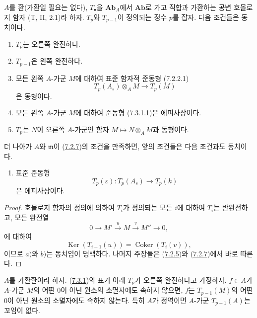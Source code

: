 \begin{proposition}[7.3.1]
\label{III.7.3.1-fr}
$A$를 환(가환일 필요는 없다), $T_\bullet$을 $\mathbf{Ab}_A$에서
$\mathbf{Ab}$로 가고 직합과 가환하는 공변 호몰로지 함자 (T, II,
2.1)라 하자. $T_p$와 $T_{p-1}$이 정의되는 정수 $p$를 잡자. 다음
조건들은 동치이다.
\begin{enumerate}
  \item[a)] $T_p$는 오른쪽 완전하다.
  \item[b)] $T_{p-1}$은 왼쪽 완전하다.
  \item[c)] 모든 왼쪽 $A$-가군 $M$에 대하여 표준 함자적 준동형
    (7.2.2.1)
    \[
      T_p(A_s)\otimes_A M\longrightarrow T_p(M)
      \tag{7.3.1.1}\label{III.7.3.1.1.fr}
    \]
    은 동형이다.
  \item[d)] 모든 왼쪽 $A$-가군 $M$에 대하여 준동형 (7.3.1.1)은
    에피사상이다.
  \item[e)] $T_p$는 $N$이 오른쪽 $A$-가군인 함자
    $M\mapsto N\otimes_A M$과 동형이다.
\end{enumerate}
더 나아가 $A$와 $\mathfrak m$이
(\hyperref[III.7.2.7-fr]{7.2.7})의 조건을 만족하면, 앞의 조건들은
다음 조건과도 동치이다.
\begin{enumerate}
  \item[f)] 표준 준동형
    \[
      T_p(\varepsilon):T_p(A_s)\longrightarrow T_p(k)
    \]
    은 에피사상이다.
\end{enumerate}
\end{proposition}

\begin{proof}
호몰로지 함자의 정의에 의하여 $T_i$가 정의되는 모든 $i$에 대하여
$T_i$는 반완전하고, 모든 완전열
\[
  0\longrightarrow M'\xrightarrow{u}M\xrightarrow{v}M''\longrightarrow0,
\]
에 대하여
\[
  \operatorname{Ker}(T_{i-1}(u))
  =
  \operatorname{Coker}(T_i(v)),
\]
이므로 $a)$와 $b)$는 동치임이 명백하다. 나머지 주장들은
(\hyperref[III.7.2.5-fr]{7.2.5})와
(\hyperref[III.7.2.7-fr]{7.2.7})에서 바로 따른다.
\end{proof}

\begin{corollary}[7.3.2]
\label{III.7.3.2-fr}
$A$를 가환환이라 하자. (\hyperref[III.7.3.1-fr]{7.3.1})의 표기 아래
$T_p$가 오른쪽 완전하다고 가정하자. $f\in A$가 $A$-가군 $M$의 어떤
0이 아닌 원소의 소멸자에도 속하지 않으면, $f$는
$T_{p-1}(M)$의 어떤 0이 아닌 원소의 소멸자에도 속하지 않는다. 특히
$A$가 정역이면 $A$-가군 $T_{p-1}(A)$는 꼬임이 없다.
\end{corollary}

